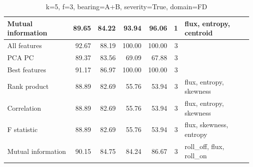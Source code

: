 \begin{table}[h]
\begin{tabular}{|l|rr|rr|r|l|}
Mutual information                    & \multicolumn{1}{r|}{89.65}          & 84.22                              & \multicolumn{1}{r|}{93.94}          & 96.06                              & 1                                                   & flux, entropy, centroid                 \\ \hline
All features                          & \multicolumn{1}{r|}{92.67}          & 88.19                              & \multicolumn{1}{r|}{100.00}         & 100.00                             & 3                                                   &                                         \\ \hline
PCA PC                                & \multicolumn{1}{r|}{89.37}          & 83.56                              & \multicolumn{1}{r|}{69.09}          & 67.88                              & 3                                                   &                                         \\ \hline
Best features                         & \multicolumn{1}{r|}{91.17}          & 86.97                              & \multicolumn{1}{r|}{100.00}         & 100.00                             & 3                                                   &                                         \\ \hline
Rank product                          & \multicolumn{1}{r|}{88.89}          & 82.69                              & \multicolumn{1}{r|}{55.76}          & 53.94                              & 3                                                   & flux, entropy, skewness                 \\ \hline
Correlation                           & \multicolumn{1}{r|}{88.89}          & 82.69                              & \multicolumn{1}{r|}{55.76}          & 53.94                              & 3                                                   & flux, entropy, skewness                 \\ \hline
F statistic                           & \multicolumn{1}{r|}{88.89}          & 82.69                              & \multicolumn{1}{r|}{55.76}          & 53.94                              & 3                                                   & flux, skewness, entropy                 \\ \hline
Mutual information                    & \multicolumn{1}{r|}{90.15}          & 84.75                              & \multicolumn{1}{r|}{84.24}          & 86.67                              & 3                                                   & roll\_off, flux, roll\_on               \\ \hline
\end{tabular}
\caption{k=5, f=3, bearing=A+B, severity=True, domain=FD}
\end{table}

